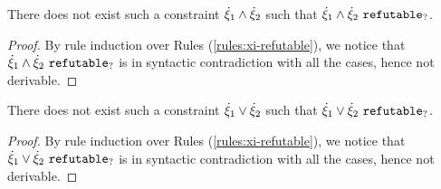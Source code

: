 \begin{lemma}
\label{lem:no-and-refutable}
There does not exist such a constraint $\dot{\xi}_1 \wedge \dot{\xi}_2$ such that $\dot{\xi}_1 \wedge \dot{\xi}_2 ~\mathtt{refutable}_?$.
\end{lemma}
\begin{proof}
By rule induction over Rules (\ref{rules:xi-refutable}), we notice that $\dot{\xi}_1 \wedge \dot{\xi}_2 ~\mathtt{refutable}_?$ is in syntactic contradiction with all the cases, hence not derivable.
\end{proof}

\begin{lemma}
\label{lem:no-or-refutable}
There does not exist such a constraint $\dot{\xi}_1 \vee \dot{\xi}_2$ such that $\dot{\xi}_1 \vee \dot{\xi}_2 ~\mathtt{refutable}_?$.
\end{lemma}
\begin{proof}
By rule induction over Rules (\ref{rules:xi-refutable}), we notice that $\dot{\xi}_1 \vee \dot{\xi}_2 ~\mathtt{refutable}_?$ is in syntactic contradiction with all the cases, hence not derivable.
\end{proof}

